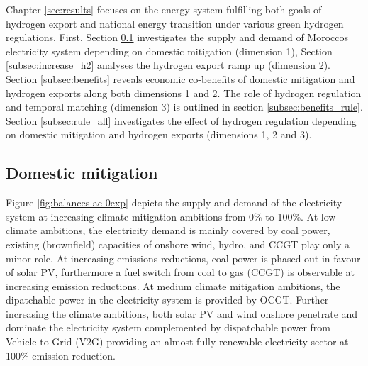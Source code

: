 Chapter \ref{sec:results} focuses on the energy system fulfilling both goals of hydrogen export and national energy transition under various green hydrogen regulations. First, Section \ref{subsec:increase_limit} investigates the supply and demand of Moroccos electricity system depending on domestic mitigation (dimension 1), Section \ref{subsec:increase_h2} analyses the hydrogen export ramp up (dimension 2). Section \ref{subsec:benefits} reveals economic co-benefits of domestic mitigation and hydrogen exports along both dimensions 1 and 2. The role of hydrogen regulation and temporal matching (dimension 3) is outlined in section \ref{subsec:benefits_rule}. Section \ref{subsec:rule_all} investigates the effect of hydrogen regulation depending on domestic mitigation and hydrogen exports (dimensions 1, 2 and 3).






\subsection{Domestic mitigation}
\label{subsec:increase_limit}
Figure \ref{fig:balances-ac-0exp} depicts the supply and demand of the electricity system at increasing climate mitigation ambitions from 0\% to 100\%. At low climate ambitions, the electricity demand is mainly covered by coal power, existing (brownfield) capacities of onshore wind, hydro, and CCGT play only a minor role. 
At increasing emissions reductions, coal power is phased out in favour of solar PV, furthermore a fuel switch from coal to gas (CCGT) is observable at increasing emission reductions. At medium climate mitigation ambitions, the dipatchable power in the electricity system is provided by OCGT. 
Further increasing the climate ambitions, both solar PV and wind onshore penetrate and dominate the electricity system complemented by dispatchable power from Vehicle-to-Grid (V2G) providing an almost fully renewable electricity sector at 100\% emission reduction. 

